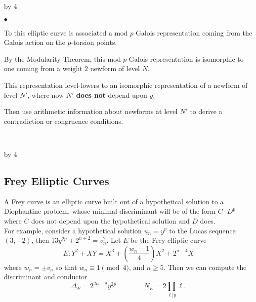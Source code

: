 \documentclass[12pt]{scrartcl}
\newenvironment{citemize}{
\begin{list}{$\bullet$}{\setlength{\itemsep}{0pt} \setlength{\rightmargin}{0pt} \setlength{\leftmargin}{0.5\labelwidth} \setlength{\topsep}{0pt}}
}{\end{list}}
\def\anzspalten{4}
\newlength{\kastenwidth}
\newenvironment{kasten}{%
  \begin{lrbox}{\dummybox}%
    \begin{minipage}{0.96\linewidth}}%
    {\end{minipage}%
  \end{lrbox}%
  \raisebox{-\depth}{\psshadowbox[framesep=1em]{\usebox{\dummybox}}}\\[0.5em]}
\newenvironment{spalte}{%
  \setlength\kastenwidth{1.2\textwidth}
  \divide\kastenwidth by \anzspalten
  \begin{minipage}[t]{\kastenwidth}}{\end{minipage}\hfill}
\renewcommand{\emph}[1]{{\color{red}\textbf{#1}}}
\begin{document}
\begin{lrbox}{\spalten}
{\begin{spalte}
\begin{kasten}
\begin{citemize}
\item To this elliptic curve is associated a mod $p$ Galois representation coming from the Galois action on the $p$-torsion points.

\item By the Modularity Theorem, this mod $p$ Galois representation is isomorphic to one coming from a weight $2$ newform of level $N$.

\item This representation level-lowers to an isomorphic representation of a newform of level $N'$, where now $N'$ \emph{does not} depend upon $y$.

\item Then use arithmetic information about newforms at level $N'$ to derive a contradiction or congruence conditions.

\end{citemize}

\end{kasten}



\end{spalte}
    \begin{spalte}


\begin{kasten}

\subsection*{\color{blue} Frey Elliptic Curves}

A Frey curve is an elliptic curve built out of a hypothetical solution to a Diophantine problem, whose minimal discriminant will be of the form $C\cdot D^p$ where $C$ does not depend upon the hypothetical solution and $D$ does. \\

For example, consider a hypothetical solution $u_n = y^p$ to the Lucas sequence $(3,-2)$, then $13y^{2p} + 2^{n+2} = v_n^2$.
Let $E$ be the Frey elliptic curve
\[ E: Y^2 + XY = X^3 + \left(\frac{w_n-1}{4} \right)X^2 + 2^{n-4}X \]
where $w_n = \pm v_n$ so that $w_n \equiv 1 \pmod{4}$, and $n \geq 5$.  Then we can compute the discriminant and conductor
\[ \Delta_E = 2^{2n-8}y^{2p} \qquad \qquad N_E = 2 \prod_{\ell | y} \ell. \]

\end{kasten}


\end{spalte}}
\end{lrbox}
\end{document}
